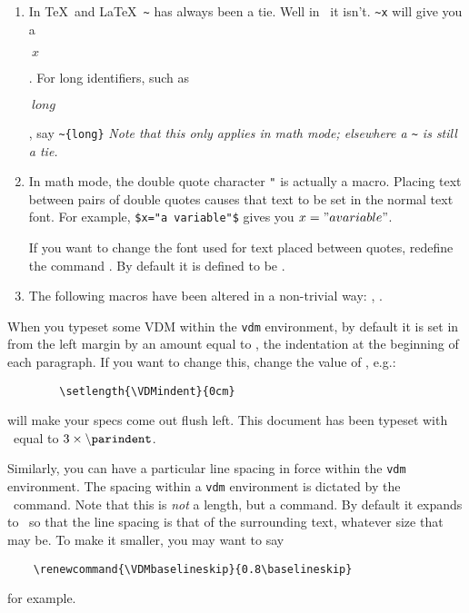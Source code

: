 {\begin{enumerate}
\item	In \TeX\ and \LaTeX\ \verb;~; has always been a tie.  Well
	in \Vdm\ it isn't.  \verb;~x; will give you a
	\begin{vdm}$~x$\end{vdm}.  For long identifiers, such as
	\begin{vdm}$~{long}$\end{vdm}, say
	\verb;~{long};  {\em Note that this only applies in math
	mode; elsewhere a \verb;~; is still a tie.} 
\item	In math mode, the double quote character \verb;"; is actually
	a macro.  Placing text between pairs of double quotes causes
	that text to be set in the normal text font.  For example,
	\verb;$x="a variable"$; gives you $x="a variable"$.  
	\begin{dangerous}
	If you want to change the font used for text placed between
	quotes, redefine the command \cs\mathTextFont.  By default
	it is defined to be \cs\rm.
	\end{dangerous}
\item	The following macros have been altered in a non-trivial way:
	\cs\forall, \cs\exists.
\end{enumerate}

\begin{dangerous}
When you typeset some VDM within the {\tt vdm\/} environment, by
default it is set in from the left margin by an amount equal to
\cs\parindent, the indentation at the beginning of each paragraph.
If you want to change this, change the value of \cs\VDMindent, e.g.:
\begin{verbatim}
        \setlength{\VDMindent}{0cm}
\end{verbatim}
will make your specs come out flush left.  This document has been
typeset with \cs\VDMindent\ equal to $3\times \cs\parindent$.
\end{dangerous}

\begin{dangerous}
Similarly, you can have a particular line spacing in force within the
{\tt vdm} environment.
The spacing within a {\tt vdm} environment is dictated by the
\cs\VDMbaselineskip\ command.  Note that this is {\em not\/} a
length, but a command.  By default it expands to \cs\baselineskip\
so that the line spacing is that of the surrounding text, whatever 
size that may be.  To make it smaller, you may want to say
\begin{verbatim}
    \renewcommand{\VDMbaselineskip}{0.8\baselineskip}
\end{verbatim}
for example.
\end{dangerous}


}
